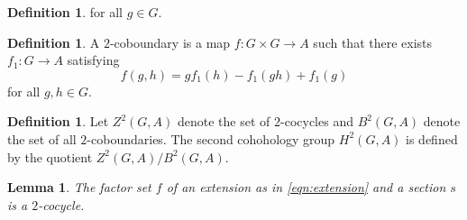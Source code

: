\documentclass{dcthesis}
\newcommand{\defi}[1]{\textsf{#1}}
\newcommand{\wt}[1]{\widetilde{#1}}
\numberwithin{equation}{section}
\newtheorem{lemma}[equation]{Lemma}
\theoremstyle{definition}
\newtheorem{definition}[equation]{Definition}
\theoremstyle{remark}
\begin{document}
{{{\begin{definition}
      for all $g\in G$.
    \end{definition}
    \begin{definition}
      \label{def:twocoboundary}
      A \defi{$2$-coboundary}
      is a map
      $f\colon G\times G\to A$
      such that there exists
      $f_1\colon G\to A$ satisfying
      \begin{equation}
        \label{eqn:twocoboundary}
        f(g,h) = gf_1(h)-f_1(gh)+f_1(g)
      \end{equation}
      for all $g,h\in G$.
    \end{definition}
    \begin{definition}
      \label{def:h2}
      Let $Z^2(G,A)$ denote the set
      of $2$-cocycles and $B^2(G,A)$
      denote the set of all $2$-coboundaries.
      The \defi{second cohohology group} $H^2(G,A)$
      is defined by the
      quotient $Z^2(G,A)/B^2(G,A)$.
    \end{definition}
    \begin{lemma}
      \label{lem:factorsetisacocycle}
      The factor set $f$ of an extension
      as in \eqref{eqn:extension}
      and a section $s$ is a $2$-cocycle.
    \end{lemma}
}}}
\end{document}
